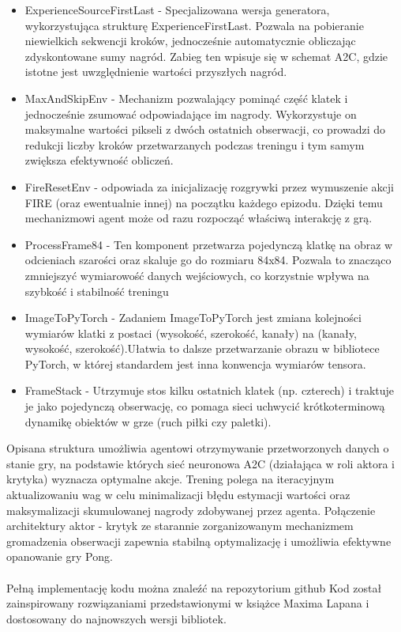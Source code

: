\documentclass[a4paper, 12pt]{article}
\numberwithin{equation}{section}
\begin{document}
\begin{itemize}
        \item ExperienceSourceFirstLast - Specjalizowana wersja generatora, wykorzystująca strukturę ExperienceFirstLast. Pozwala na pobieranie niewielkich sekwencji kroków, jednocześnie automatycznie obliczając zdyskontowane sumy nagród. Zabieg ten wpisuje się w schemat A2C, gdzie istotne jest uwzględnienie wartości przyszłych nagród.
        \item MaxAndSkipEnv - Mechanizm pozwalający pominąć część klatek i jednocześnie zsumować odpowiadające im nagrody. Wykorzystuje on maksymalne wartości pikseli z dwóch ostatnich obserwacji, co prowadzi do redukcji liczby kroków przetwarzanych podczas treningu i tym samym zwiększa efektywność obliczeń.
        \item FireResetEnv - odpowiada za inicjalizację rozgrywki przez wymuszenie akcji FIRE (oraz ewentualnie innej) na początku każdego epizodu. Dzięki temu mechanizmowi agent może od razu rozpocząć właściwą interakcję z grą.
        \item ProcessFrame84 - Ten komponent przetwarza pojedynczą klatkę na obraz w odcieniach szarości oraz skaluje go do rozmiaru 84x84. Pozwala to znacząco zmniejszyć wymiarowość danych wejściowych, co korzystnie wpływa na szybkość i stabilność treningu
        \item ImageToPyTorch - Zadaniem ImageToPyTorch jest zmiana kolejności wymiarów klatki z postaci (wysokość, szerokość, kanały) na (kanały, wysokość, szerokość).Ułatwia to dalsze przetwarzanie obrazu w bibliotece PyTorch, w której standardem jest inna konwencja wymiarów tensora.
        \item FrameStack - Utrzymuje stos kilku ostatnich klatek (np. czterech) i traktuje je jako pojedynczą obserwację, co pomaga sieci uchwycić krótkoterminową dynamikę obiektów w grze (ruch piłki czy paletki).
    \end{itemize}
    Opisana struktura umożliwia agentowi otrzymywanie przetworzonych danych o stanie gry, na podstawie których sieć neuronowa A2C (działająca w roli aktora i krytyka) wyznacza optymalne akcje. Trening polega na iteracyjnym aktualizowaniu wag w celu minimalizacji błędu estymacji wartości oraz maksymalizacji skumulowanej nagrody zdobywanej przez agenta. Połączenie architektury aktor - krytyk ze starannie zorganizowanym mechanizmem gromadzenia obserwacji zapewnia stabilną optymalizację i umożliwia efektywne opanowanie gry Pong.
    \\ \\ 
    Pełną implementację kodu można znaleźć na repozytorium github \cite{A2C}
    Kod został zainspirowany rozwiązaniami przedstawionymi w książce Maxima Lapana \cite{lapan2020deep} i dostosowany do najnowszych wersji bibliotek.
\end{document}
